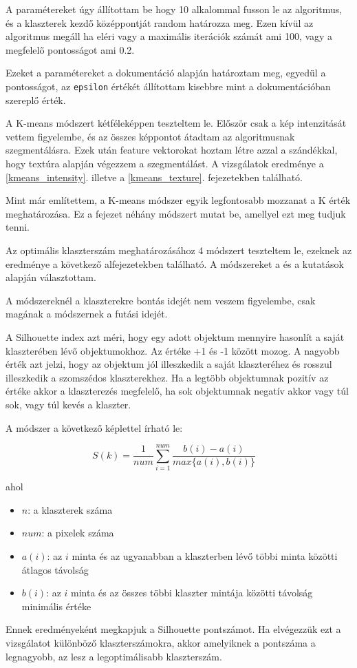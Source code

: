 A paramétereket úgy állítottam be hogy 10 alkalommal fusson le az algoritmus, és a klaszterek kezdő középpontját random határozza meg. Ezen kívül az algoritmus megáll ha eléri vagy a maximális iterációk számát ami 100, vagy a megfelelő pontosságot ami 0.2.

Ezeket a paramétereket a \cite{kmeans_opencv} dokumentáció alapján határoztam meg, egyedül a pontosságot, az \texttt{epsilon} értékét állítottam kisebbre mint a dokumentációban szereplő érték.

A K-means módszert kétféleképpen teszteltem le. Először csak a kép intenzitását vettem figyelembe, és az összes képpontot átadtam az algoritmusnak szegmentálásra. Ezek után feature vektorokat hoztam létre azzal a szándékkal, hogy textúra alapján végezzem a szegmentálást. A vizsgálatok eredménye a \ref{kmeans_intensity}. illetve a \ref{kmeans_texture}. fejezetekben található.

 \label{optimal_cluster_number}
Mint már említettem, a K-means módszer egyik legfontosabb mozzanat a K érték meghatározása. Ez a fejezet néhány módszert mutat be, amellyel ezt meg tudjuk tenni.

Az optimális klaszterszám meghatározásához 4 módszert teszteltem le, ezeknek az eredménye a következő alfejezetekben található.
A módszereket a \cite{tomatoleaf} és a \cite{elbow} kutatások alapján választottam.

A módszereknél a klaszterekre bontás idejét nem veszem figyelembe, csak magának a módszernek a futási idejét.


A Silhouette index azt méri, hogy egy adott objektum mennyire hasonlít a saját klaszterében lévő objektumokhoz. Az értéke +1 és -1 között mozog. A nagyobb érték azt jelzi, hogy az objektum jól illeszkedik a saját klaszteréhez és rosszul illeszkedik a szomszédos klaszterekhez. Ha a legtöbb objektumnak pozitív az értéke akkor a klaszterezés megfelelő, ha sok objektumnak negatív akkor vagy túl sok, vagy túl kevés a klaszter.

A módszer a következő képlettel írható le:

\[ S(k)=\frac{1}{num} \sum_{i=1}^{num} \frac{b(i)-a(i)}{max\{a(i),b(i)\}} \quad \]

\noindent ahol
\begin{itemize}
\item $n$: a klaszterek száma
\item $num$: a pixelek száma
\item $a(i)$: az $i$ minta és az ugyanabban a klaszterben lévő többi minta közötti átlagos távolság
\item $b(i)$: az $i$ minta és az összes többi klaszter mintája közötti távolság minimális értéke
\end{itemize}
Ennek eredményeként megkapjuk a Silhouette pontszámot. Ha elvégezzük ezt a vizsgálatot különböző klaszterszámokra, akkor amelyiknek a pontszáma a legnagyobb, az lesz a legoptimálisabb klaszterszám. \cite{tomatoleaf}

